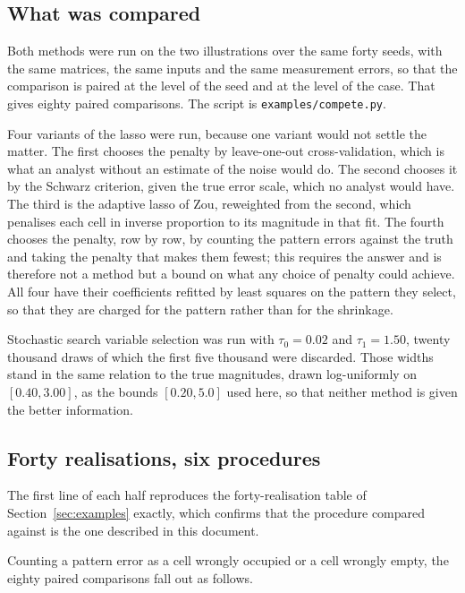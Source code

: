 \subsection{What was compared}

Both methods were run on the two illustrations over the same forty seeds, with the
same matrices, the same inputs and the same measurement errors, so that the
comparison is paired at the level of the seed and at the level of the case. That
gives eighty paired comparisons. The script is \texttt{examples/compete.py}.

Four variants of the lasso were run, because one variant would not settle the matter.
The first chooses the penalty by leave-one-out cross-validation, which is what an
analyst without an estimate of the noise would do. The second chooses it by the
Schwarz criterion, given the true error scale, which no analyst would have. The third
is the adaptive lasso of Zou, reweighted from the second, which penalises each cell
in inverse proportion to its magnitude in that fit. The fourth chooses the penalty,
row by row, by counting the pattern errors against the truth and taking the penalty
that makes them fewest; this requires the answer and is therefore not a method but a
bound on what any choice of penalty could achieve. All four have their coefficients
refitted by least squares on the pattern they select, so that they are charged for
the pattern rather than for the shrinkage.

Stochastic search variable selection was run with $\tau_{0} = 0.02$ and
$\tau_{1} = 1.50$, twenty thousand draws of which the first five thousand were
discarded. Those widths stand in the same relation to the true magnitudes, drawn
log-uniformly on $[0.40, 3.00]$, as the bounds $[0.20, 5.0]$ used here, so that
neither method is given the better information.

\subsection{Forty realisations, six procedures}



The first line of each half reproduces the forty-realisation table of
Section~\ref{sec:examples} exactly, which confirms that the procedure compared
against is the one described in this document.

Counting a pattern error as a cell wrongly occupied or a cell wrongly empty, the
eighty paired comparisons fall out as follows.

